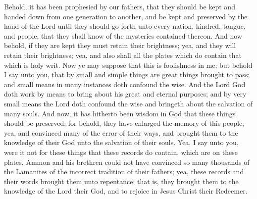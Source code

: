 Behold, it has been prophesied by our fathers, that they should be kept and handed down from one generation to another, and be kept and preserved by the hand of the Lord until they should go forth unto every nation, kindred, tongue, and people, that they shall know of the mysteries contained thereon.
\bverse \iffalse And now behold, if they are kept they must retain their brightness; yea, and they will retain their brightness; yea, and also shall all the plates which do contain that which is holy writ. \fi
And now behold, if they are kept they must retain their brightness; yea, and they will retain their brightness; yea, and also shall all the plates which do contain that which is holy writ.
\bverse \iffalse Now ye may suppose that this is foolishness in me; but behold I say unto you, that by small and simple things are great things brought to pass; and small means in many instances doth confound the wise. \fi
Now ye may suppose that this is foolishness in me; but behold I say unto you, that by small and simple things are great things brought to pass; and small means in many instances doth confound the wise.
\bverse \iffalse And the Lord God doth work by means to bring about his great and eternal purposes; and by very small means the Lord doth confound the wise and bringeth about the salvation of many souls. \fi
And the Lord God doth work by means to bring about his great and eternal purposes; and by very small means the Lord doth confound the wise and bringeth about the salvation of many souls.
\bverse \iffalse And now, it has hitherto been wisdom in God that these things should be preserved; for behold, they have enlarged the memory of this people, yea, and convinced many of the error of their ways, and brought them to the knowledge of their God unto the salvation of their souls. \fi
And now, it has hitherto been wisdom in God that these things should be preserved; for behold, they have enlarged the memory of this people, yea, and convinced many of the error of their ways, and brought them to the knowledge of their God unto the salvation of their souls.
\bverse \iffalse Yea, I say unto you, were it not for these things that these records do contain, which are on these plates, Ammon and his brethren could not have convinced so many thousands of the Lamanites of the incorrect tradition of their fathers; yea, these records and their words brought them unto repentance; that is, they brought them to the knowledge of the Lord their God, and to rejoice in Jesus Christ their Redeemer. \fi
Yea, I say unto you, were it not for these things that these records do contain, which are on these plates, Ammon and his brethren could not have convinced so many thousands of the Lamanites of the incorrect tradition of their fathers; yea, these records and their words brought them unto repentance; that is, they brought them to the knowledge of the Lord their God, and to rejoice in Jesus Christ their Redeemer.

